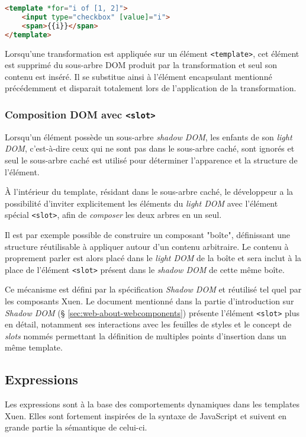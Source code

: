 \begin{lstlisting}[language=HTML]
<template *for="i of [1, 2]">
	<input type="checkbox" [value]="i">
	<span>{{i}}</span>
</template>
\end{lstlisting}

Lorsqu'une transformation est appliquée sur un élément \texttt{<template>}, cet élément est supprimé du sous-arbre DOM produit par la transformation et seul son contenu est inséré. Il se substitue ainsi à l'élément encapsulant mentionné précédemment et disparait totalement lors de l'application de la transformation.

\subsubsection{Composition DOM avec \texttt{<slot>}}

Lorsqu'un élément possède un sous-arbre \emph{shadow DOM}, les enfants de son \emph{light DOM}, c'est-à-dire ceux qui ne sont pas dans le sous-arbre caché, sont ignorés et seul le sous-arbre caché est utilisé pour déterminer l'apparence et la structure de l'élément.

À l'intérieur du template, résidant dans le sous-arbre caché, le développeur a la possibilité d'inviter explicitement les éléments du \emph{light DOM} avec l'élément spécial \texttt{<slot>}, afin de \emph{composer} les deux arbres en un seul.

Il est par exemple possible de construire un composant "boîte", définissant une structure réutilisable à appliquer autour d'un contenu arbitraire. Le contenu à proprement parler est alors placé dans le \emph{light DOM} de la boîte et sera inclut à la place de l'élément \texttt{<slot>} présent dans le \emph{shadow DOM} de cette même boîte.

Ce mécanisme est défini par la spécification \emph{Shadow DOM} et réutilisé tel quel par les composants Xuen. Le document mentionné dans la partie d'introduction sur \emph{Shadow DOM} (§ \ref{sec:web-about-webcomponents}) présente l'élément \texttt{<slot>} plus en détail, notamment ses interactions avec les feuilles de styles et le concept de \emph{slots} nommés permettant la définition de multiples points d'insertion dans un même template.

\subsection{Expressions} \label{sec:web-usage-expr}
Les expressions sont à la base des comportements dynamiques dans les templates Xuen. Elles sont fortement inspirées de la syntaxe de JavaScript et suivent en grande partie la sémantique de celui-ci.

